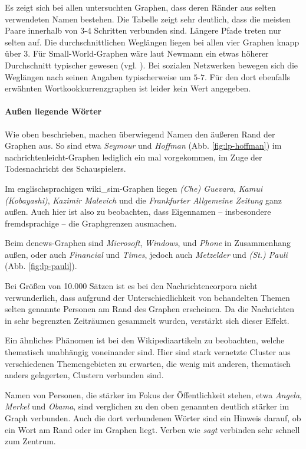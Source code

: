 \documentclass[11pt, a4paper]{article}
\begin{document}
Es zeigt sich bei allen untersuchten Graphen, dass deren Ränder aus selten verwendeten Namen bestehen.
Die Tabelle zeigt sehr deutlich, dass die meisten Paare innerhalb von 3-4 Schritten verbunden sind.
Längere Pfade treten nur selten auf.
Die durchschnittlichen Weglängen liegen bei allen vier Graphen knapp über 3.
Für Small-World-Graphen wäre laut Newmann ein etwas höherer Durchschnitt typischer gewesen (vgl. \cite{Newman2003}).
Bei sozialen Netzwerken bewegen sich die Weglängen nach seinen Angaben typischerweise um $5$-$7$.
Für den dort ebenfalls erwähnten Wortkookkurrenzgraphen ist leider kein Wert angegeben.

\paragraph{Außen liegende Wörter}
Wie oben beschrieben, machen überwiegend Namen den äußeren Rand der Graphen aus.
So sind etwa \emph{Seymour} und \emph{Hoffman} (Abb. \ref{fig:lp-hoffman}) im nachrichtenleicht-Graphen lediglich ein mal vorgekommen, im Zuge der Todesnachricht des Schauspielers.

Im englischsprachigen wiki\_sim-Graphen liegen \emph{(Che) Guevara}, \emph{Kamui (Kobayashi)}, \emph{Kazimir Malevich} und die \emph{Frankfurter Allgemeine Zeitung} ganz außen.
Auch hier ist also zu beobachten, dass Eigennamen -- insbesondere fremdsprachige -- die Graphgrenzen ausmachen.

Beim denews-Graphen sind \emph{Microsoft}, \emph{Windows}, und \emph{Phone} in Zusammenhang außen, oder auch \emph{Financial} und \emph{Times}, jedoch auch \emph{Metzelder} und \emph{(St.) Pauli} (Abb. \ref{fig:lp-pauli}).

Bei Größen von 10.000 Sätzen ist es bei den Nachrichtencorpora nicht verwunderlich, dass aufgrund der Unterschiedlichkeit von behandelten Themen selten genannte Personen am Rand des Graphen erscheinen.
Da die Nachrichten in sehr begrenzten Zeiträumen gesammelt wurden, verstärkt sich dieser Effekt.

Ein ähnliches Phänomen ist bei den Wikipediaartikeln zu beobachten, welche thematisch unabhängig voneinander sind.
Hier sind stark vernetzte Cluster aus verschiedenen Themengebieten zu erwarten, die wenig mit anderen, thematisch anders gelagerten, Clustern verbunden sind.

Namen von Personen, die stärker im Fokus der Öffentlichkeit stehen, etwa \emph{Angela}, \emph{Merkel} und \emph{Obama}, sind verglichen zu den oben genannten deutlich stärker im Graph verbunden.
Auch die dort verbundenen Wörter sind ein Hinweis darauf, ob ein Wort am Rand oder im Graphen liegt.
Verben wie \emph{sagt} verbinden sehr schnell zum Zentrum.
\end{document}
